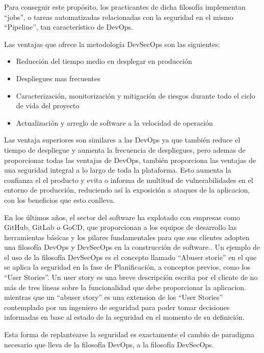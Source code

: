 \documentclass[12pt]{report} %
\begin{document}
Para conseguir este propósito, los practicantes de dicha filosofía implementan
``jobs'', o tareas automatizadas relacionadas con la seguridad en el mismo
``Pipeline'', tan característico de DevOps.

Las ventajas que ofrece la metodología \gls{DevSecOps} son las siguientes:

\begin{itemize}
  \item{Reducción del tiempo medio en desplegar en producción}
  \item{Despliegues mas frecuentes}
  \item{Caracterización, monitorización y mitigación de riesgos durante todo el
    ciclo de vida del proyecto}
  \item{Actualización y arreglo de software a la velocidad de operación}
\end{itemize}

Las ventaja superiores son similares a las \gls{DevOps} ya que también reduce
el tiempo de despliegue y aumenta la frecuencia de despliegues, pero ademas de
proporcionar todas las ventajas de \gls{DevOps}, también proporciona las
ventajas de una seguridad integral a lo largo de toda la plataforma.
Esto aumenta la confianza el el producto y evita o informa de multitud de
vulnerabilidades en el entorno de producción, reduciendo así la exposición a
ataques de la aplicacion, con los beneficios que esto conlleva.

En los últimos años, el sector del software ha explotado con empresas como
GitHub, GitLab o GoCD, que proporcionan a los equipos de desarrollo las
herramientas básicas y los pilares fundamentales para que sus clientes adopten
una filosofía DevOps y DevSecOps en la construcción de
software.\cite{Google2019}. Un ejemplo de el uso de la filosofía DevSecOps es el
concepto llamado ``Abuser storie'' \cite{Bor2006} en el que se aplica la
seguridad en la fase de Planificación, a conceptos previos, como los ``User
Stories''. Un user story es una breve descripción escrita por el cliente de no
más de tres líneas sobre la funcionalidad que debe proporcionar la aplicacion.
\cite{XPUserStory} mientras que un ``abuser story'' es una extension de los
``User Stories'' contemplado por un ingeniero de seguridad para poder tomar
decisiones informadas en base al estado de la seguridad en el momento de su
definición. \cite{Bor2006}

Esta forma de replantearse la seguridad es exactamente el cambio de paradigma
necesario que lleva de la filosofía \gls{DevOps}, a la filosofía
\gls{DevSecOps}.
\end{document}
